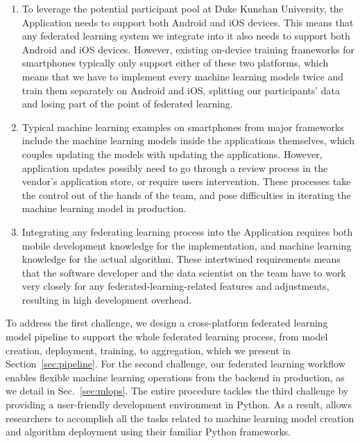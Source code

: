 \begin{enumerate}
\item To leverage the potential participant pool at Duke Kunshan University,
    the \fedcampus Application needs to support both Android and iOS devices.
    This means that any federated learning system we integrate into it
    also needs to support both Android and iOS devices.
    However, existing on-device training frameworks for smartphones typically
    only support either of these two platforms,
    which means that we have to implement every machine learning models twice
    and train them separately on Android and iOS,
    splitting our participants' data and
    losing part of the point of federated learning.
\item Typical machine learning examples on smartphones from major frameworks
    include the machine learning models inside the applications themselves,
    which couples updating the models with updating the applications.
    However, application updates possibly need to go through a review process
    in the vendor's application store, or require users intervention.
    These processes take the control out of the hands of the \fedcampus team,
    and pose difficulties in iterating the machine learning model in production.
\item Integrating any federating learning process into
    the \fedcampus Application requires both mobile development knowledge
    for the implementation,
    and machine learning knowledge for the actual algorithm.
    These intertwined requirements means that the software developer and
    the data scientist on the \fedcampus team have to work very closely for
    any federated-learning-related features and adjustments,
    resulting in high development overhead.
\end{enumerate}

To address the first challenge,
we design a cross-platform federated learning model pipeline to
support the whole federated learning process,
from model creation, deployment, training, to aggregation,
which we present in Section~\ref{sec:pipeline}.
For the second challenge,
our federated learning workflow enables flexible machine learning operations
from the backend in production,
as we detail in Sec.~\ref{sec:mlops}.
The entire procedure tackles the third challenge by
providing a user-friendly development environment in Python. As a result,
\fedkit allows researchers to accomplish all the tasks related to machine
learning model creation and algorithm deployment using their familiar Python
frameworks.

